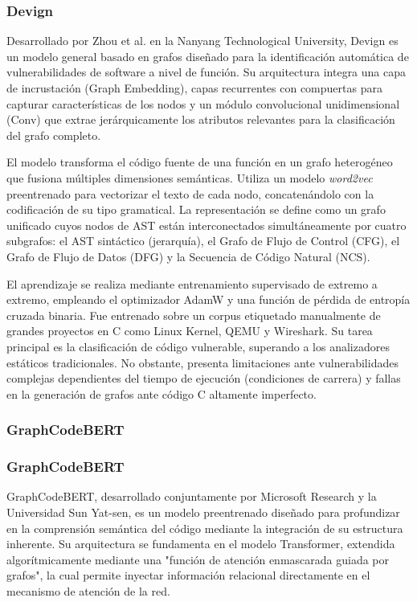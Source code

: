 \subsubsection{Devign}

Desarrollado por Zhou et al. en la Nanyang Technological University, Devign es un modelo general basado en grafos diseñado para la identificación automática de vulnerabilidades de software a nivel de función. Su arquitectura integra una capa de incrustación (Graph Embedding), capas recurrentes con compuertas para capturar características de los nodos y un módulo convolucional unidimensional (Conv) que extrae jerárquicamente los atributos relevantes para la clasificación del grafo completo.

El modelo transforma el código fuente de una función en un grafo heterogéneo que fusiona múltiples dimensiones semánticas. Utiliza un modelo \textit{word2vec} preentrenado para vectorizar el texto de cada nodo, concatenándolo con la codificación de su tipo gramatical. La representación se define como un grafo unificado cuyos nodos de AST están interconectados simultáneamente por cuatro subgrafos: el AST sintáctico (jerarquía), el Grafo de Flujo de Control (CFG), el Grafo de Flujo de Datos (DFG) y la Secuencia de Código Natural (NCS).

El aprendizaje se realiza mediante entrenamiento supervisado de extremo a extremo, empleando el optimizador AdamW y una función de pérdida de entropía cruzada binaria. Fue entrenado sobre un corpus etiquetado manualmente de grandes proyectos en C como Linux Kernel, QEMU y Wireshark. Su tarea principal es la clasificación de código vulnerable, superando a los analizadores estáticos tradicionales. No obstante, presenta limitaciones ante vulnerabilidades complejas dependientes del tiempo de ejecución (condiciones de carrera) y fallas en la generación de grafos ante código C altamente imperfecto.

\subsubsection{GraphCodeBERT}

\subsubsection{GraphCodeBERT}

GraphCodeBERT, desarrollado conjuntamente por Microsoft Research y la Universidad Sun Yat-sen, es un modelo preentrenado diseñado para profundizar en la comprensión semántica del código mediante la integración de su estructura inherente. Su arquitectura se fundamenta en el modelo Transformer, extendida algorítmicamente mediante una "función de atención enmascarada guiada por grafos", la cual permite inyectar información relacional directamente en el mecanismo de atención de la red.

